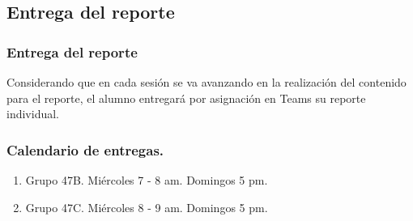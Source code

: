 \documentclass[14pt]{beamer}
\begin{document}
\subsection{Entrega del reporte}

\begin{frame}
\frametitle{Entrega del reporte}
Considerando que en cada sesión se va avanzando en la realización del contenido para el reporte, \pause el alumno entregará por asignación en Teams su reporte individual.
\end{frame}
\begin{frame}
\frametitle{Calendario de entregas.}
\begin{enumerate}[<+->]
\item Grupo 47B. Miércoles 7 - 8 am. Domingos 5 pm.
\item Grupo 47C. Miércoles 8 - 9 am. Domingos 5 pm.
\end{enumerate}
\end{frame}
\end{document}

